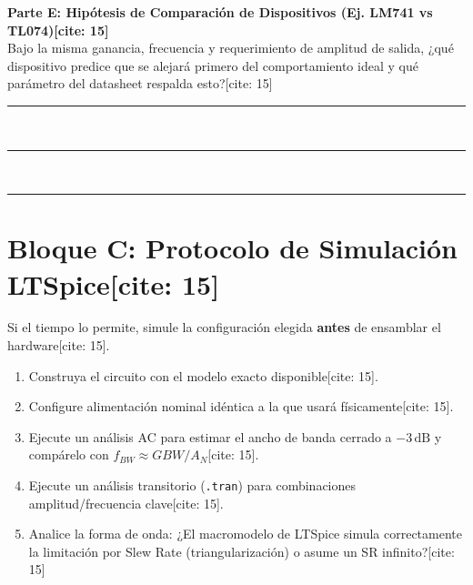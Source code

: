 \documentclass[11pt, a4paper]{article}
\begin{document}
\vspace{0.4cm}
\textbf{Parte E: Hipótesis de Comparación de Dispositivos (Ej. LM741 vs TL074)[cite: 15]} \\
Bajo la misma ganancia, frecuencia y requerimiento de amplitud de salida, ¿qué dispositivo predice que se alejará primero del comportamiento ideal y qué parámetro del datasheet respalda esto?[cite: 15] \\
\rule{\textwidth}{0.4pt} \\
\rule{\textwidth}{0.4pt} \\
\rule{\textwidth}{0.4pt}

\section*{Bloque C: Protocolo de Simulación LTSpice[cite: 15]}
Si el tiempo lo permite, simule la configuración elegida \textbf{antes} de ensamblar el hardware[cite: 15].
\begin{enumerate}
    \setlength{\itemsep}{0pt}
    \item Construya el circuito con el modelo exacto disponible[cite: 15].
    \item Configure alimentación nominal idéntica a la que usará físicamente[cite: 15].
    \item Ejecute un análisis AC para estimar el ancho de banda cerrado a $-3\,\text{dB}$ y compárelo con $f_{BW} \approx GBW/A_N$[cite: 15].
    \item Ejecute un análisis transitorio (\texttt{.tran}) para combinaciones amplitud/frecuencia clave[cite: 15].
    \item Analice la forma de onda: ¿El macromodelo de LTSpice simula correctamente la limitación por Slew Rate (triangularización) o asume un SR infinito?[cite: 15]
\end{enumerate}
\end{document}
